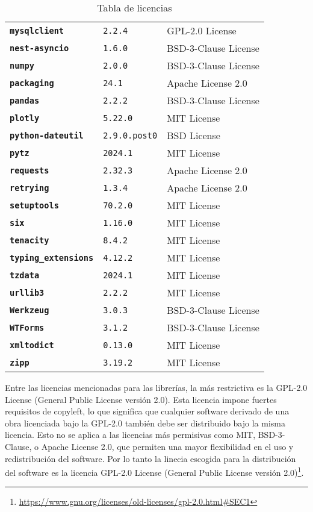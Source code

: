 \begin{table}
{\begin{tabular}{@{}p{14em} p{6em} p{20em}@{}}
            \texttt{\textbf{mysqlclient}} & \texttt{2.2.4} & GPL-2.0 License \\
            \texttt{\textbf{nest-asyncio}} & \texttt{1.6.0} & BSD-3-Clause License \\
            \texttt{\textbf{numpy}} & \texttt{2.0.0} & BSD-3-Clause License \\
            \texttt{\textbf{packaging}} & \texttt{24.1} & Apache License 2.0 \\
            \texttt{\textbf{pandas}} & \texttt{2.2.2} & BSD-3-Clause License \\
            \texttt{\textbf{plotly}} & \texttt{5.22.0} & MIT License \\
            \texttt{\textbf{python-dateutil}} & \texttt{2.9.0.post0} & BSD License \\
            \texttt{\textbf{pytz}} & \texttt{2024.1} & MIT License \\
            \texttt{\textbf{requests}} & \texttt{2.32.3} & Apache License 2.0 \\
            \texttt{\textbf{retrying}} & \texttt{1.3.4} & Apache License 2.0 \\
            \texttt{\textbf{setuptools}} & \texttt{70.2.0} & MIT License \\
            \texttt{\textbf{six}} & \texttt{1.16.0} & MIT License \\
            \texttt{\textbf{tenacity}} & \texttt{8.4.2} & MIT License \\
            \texttt{\textbf{typing\_extensions}} & \texttt{4.12.2} & MIT License \\
            \texttt{\textbf{tzdata}} & \texttt{2024.1} & MIT License \\
            \texttt{\textbf{urllib3}} & \texttt{2.2.2} & MIT License \\
            \texttt{\textbf{Werkzeug}} & \texttt{3.0.3} & BSD-3-Clause License \\
            \texttt{\textbf{WTForms}} & \texttt{3.1.2} & BSD-3-Clause License \\
            \texttt{\textbf{xmltodict}} & \texttt{0.13.0} & MIT License \\
            \texttt{\textbf{zipp}} & \texttt{3.19.2} & MIT License \\
			\bottomrule
		\end{tabular}
	}
	\caption{Tabla de licencias}
    \label{tabla-licencias}
\end{table}

Entre las licencias mencionadas para las librerías, la más restrictiva es la GPL-2.0 License (General Public License versión 2.0). Esta licencia impone fuertes requisitos de copyleft, lo que significa que cualquier software derivado de una obra licenciada bajo la GPL-2.0 también debe ser distribuido bajo la misma licencia. Esto no se aplica a las licencias más permisivas como MIT, BSD-3-Clause, o Apache License 2.0, que permiten una mayor flexibilidad en el uso y redistribución del software.
Por lo tanto la linecia escogida para la distribución del software es la licencia  GPL-2.0 License (General Public License versión 2.0)\footnote{\url{https://www.gnu.org/licenses/old-licenses/gpl-2.0.html#SEC1}}.


